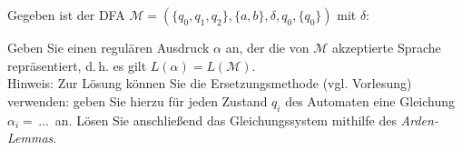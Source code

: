 
\begin{exercise}
Gegeben ist der DFA $\mathcal M=(\{q_0,q_1,q_2\},\{a,b\},\delta , q_0,\{q_0\})$ mit $\delta$:
 \begin{center}
    
 \end{center}
Geben Sie einen regul\"aren Ausdruck $\alpha$ an, der die von $\mathcal M$ akzeptierte Sprache repr\"asentiert, d.\,h. es gilt $L(\alpha)=L(\mathcal M)$.\\[0.2cm]

Hinweis: Zur Lösung können Sie die Ersetzungsmethode (vgl. Vorlesung) verwenden: geben Sie hierzu für jeden Zustand $q_i$ des
Automaten eine Gleichung $\alpha_{i}=\,\ldots\,$ an. Lösen Sie anschlie\ss{}end
das Gleichungssystem mithilfe des {\itshape{Arden-Lemmas}}.
\end{exercise}

